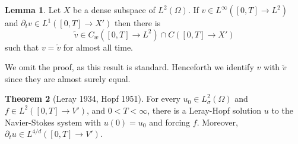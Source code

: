 \documentclass[12pt]{book}
\theoremstyle{definition}
\newtheorem{theorem}{Theorem}[chapter]
\newtheorem{lemma}[theorem]{Lemma}
\begin{document}
\begin{lemma}
Let $X$ be a dense subspace of $L^2(\Omega)$.
If $v \in L^\infty([0, T] \to L^2)$ and $\partial_t v \in L^1([0, T] \to X')$ then there is
$$\tilde v \in C_w([0, T] \to L^2) \cap C([0, T] \to X')$$
such that $v = \tilde v$ for almost all time.
\end{lemma}
We omit the proof, as this result is standard.
Henceforth we identify $v$ with $\tilde v$ since they are almost surely equal.

\begin{theorem}[Leray 1934, Hopf 1951]
For every $u_0 \in L^2_\sigma(\Omega)$ and $f \in L^2([0, T] \to V')$, and $0 < T < \infty$, there is a Leray-Hopf solution $u$ to the Navier-Stokes system with $u(0) = u_0$ and forcing $f$.
Moreover, $\partial_t u \in L^{4/d}([0, T] \to V')$.
\end{theorem}
\end{document}
